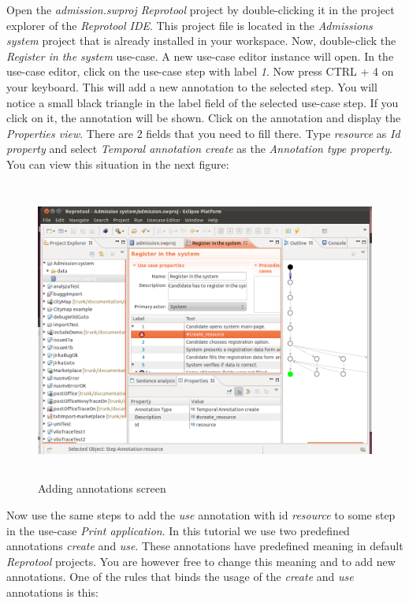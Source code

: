 Open the \emph{admission.swproj Reprotool} project by double-clicking it in the project explorer of the \emph{Reprotool IDE}. This project
file is located in the \emph{Admissions system} project that is already installed in your workspace. Now, double-click the
\emph{Register in the system} use-case. A new use-case editor instance will open. In the use-case editor, click on the use-case step with
label \emph{1}. Now press CTRL + 4 on your keyboard. This will add a new annotation to the
selected step. You will notice a small black triangle in the label field of the selected use-case step. If you click on it, the
annotation will be shown. Click on the annotation and display the \emph{Properties view}. There are 2 fields that you need to fill there.
Type \emph{resource} as \emph{Id property} and select \emph{Temporal annotation create} as the \emph{Annotation type property}. 
You can view this situation in the next figure:

\begin{figure}[ht]
  \centering
  \includegraphics[height=280pt]{images/reprotoolQuickTutorial1}
  \caption{Adding annotations screen}
  \label{fig:reprotoolQuickTutorial1}
\end{figure}

Now use the same steps to add the \emph{use} annotation with id \emph{resource} to some step in the use-case \emph{Print application}.
In this tutorial we use two predefined annotations \emph{create} and \emph{use}. These annotations have predefined meaning in default
\emph{Reprotool} projects. You are however free to change this meaning and to add new annotations. One of the rules that binds the
usage of the \emph{create} and \emph{use} annotations is this:

